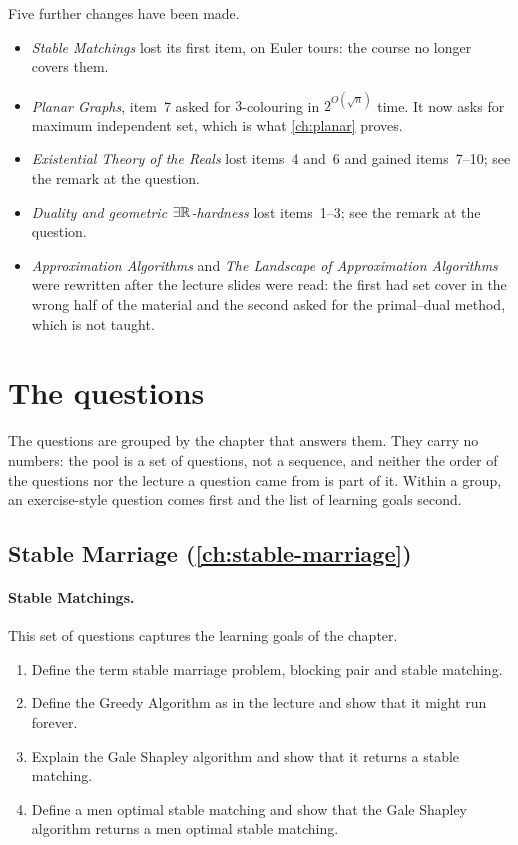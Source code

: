 Five further changes have been made.

\begin{itemize}[leftmargin=*]
  \item \emph{Stable Matchings} lost its first item, on Euler tours: the course
        no longer covers them.
  \item \emph{Planar Graphs}, item~7 asked for $3$-colouring in
        $2^{O(\sqrt n)}$ time. It now asks for maximum independent set, which
        is what \cref{ch:planar} proves.
  \item \emph{Existential Theory of the Reals} lost items~4 and~6 and gained
        items~7--10; see the remark at the question.
  \item \emph{Duality and geometric $\exists\mathbb{R}$-hardness} lost items~1--3; see the
        remark at the question.
  \item \emph{Approximation Algorithms} and \emph{The Landscape of Approximation
        Algorithms} were rewritten after the lecture slides were read: the first
        had set cover in the wrong half of the material and the second asked for
        the primal--dual method, which is not taught.
\end{itemize}

\section{The questions}
\label{sec:pool-questions}

The questions are grouped by the chapter that answers them. They carry no
numbers: the pool is a set of questions, not a sequence, and neither the order
of the questions nor the lecture a question came from is part of it. Within a
group, an exercise-style question comes first and the list of learning goals
second.

\subsection*{Stable Marriage (\cref{ch:stable-marriage})}

\paragraph{Stable Matchings.}
This set of questions captures the learning goals of the chapter.
\begin{enumerate}
  \item Define the term stable marriage problem, blocking pair and stable
        matching.
  \item Define the Greedy Algorithm as in the lecture and show that it might run
        forever.
  \item Explain the Gale Shapley algorithm and show that it returns a stable
        matching.
  \item Define a men optimal stable matching and show that the Gale Shapley
        algorithm returns a men optimal stable matching.
\end{enumerate}

